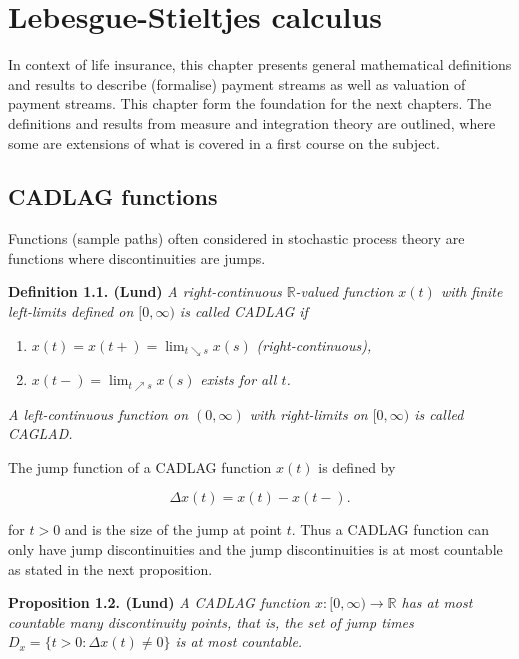 \documentclass[a4paper,10pt,openany]{book}
\providecommand{\tightlist}{%
 \setlength{\itemsep}{0pt}\setlength{\parskip}{0pt}}
\begin{document}
\hypertarget{lebesgue-stieltjes-calculus}{%
\section{Lebesgue-Stieltjes calculus}\label{lebesgue-stieltjes-calculus}}

In context of life insurance, this chapter presents general mathematical definitions and results to describe (formalise) payment streams as well as valuation of payment streams. This chapter form the foundation for the next chapters. The definitions and results from measure and integration theory are outlined, where some are extensions of what is covered in a first course on the subject.

\hypertarget{cadlag-functions}{%
\subsection{CADLAG functions}\label{cadlag-functions}}

Functions (sample paths) often considered in stochastic process theory are functions where discontinuities are jumps.

\textbf{Definition 1.1. (Lund)} \emph{A right-continuous \(\mathbb R\)-valued function \(x(t)\) with finite left-limits defined on \([0,\infty)\) is called CADLAG if}

\begin{enumerate}
\def\labelenumi{\roman{enumi})}
\tightlist
\item
  \(x(t)=x(t+)=\lim_{t\searrow s}x(s)\) \emph{(right-continuous),}
\item
  \(x(t-)=\lim_{t\nearrow s}x(s)\) \emph{exists for all \(t\).}
\end{enumerate}

\emph{A left-continuous function on \((0,\infty)\) with right-limits on \([0, \infty)\) is called CAGLAD.}

The jump function of a CADLAG function \(x(t)\) is defined by

\[
\Delta x(t)=x(t)-x(t-).
\]

for \(t>0\) and is the size of the jump at point \(t\). Thus a CADLAG function can only have jump discontinuities and the jump discontinuities is at most countable as stated in the next proposition.

\textbf{Proposition 1.2. (Lund)} \emph{A CADLAG function \(x : [0, \infty) \to \mathbb R\) has at most countable many discontinuity points, that is, the set of jump times \(D_x = \{t > 0 : \Delta x(t)\ne 0\}\) is at most countable.}
\end{document}
